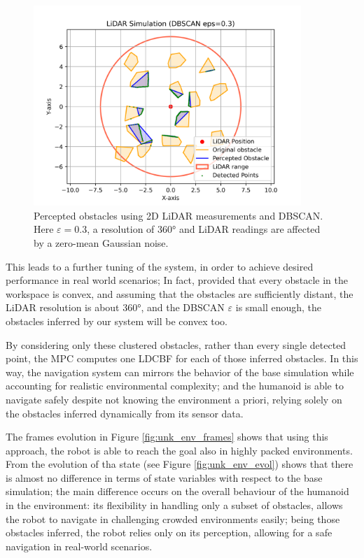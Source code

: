 \begin{figure}[H]
    \centering
    \includegraphics[width=0.9\textwidth]{../figures/Simulations/dbscan/dbscan_and_rangefinder.png}
    \caption{Percepted obstacles using 2D LiDAR measurements and DBSCAN. Here $\varepsilon=0.3$, a resolution of 360° and LiDAR readings are affected by a zero-mean Gaussian noise.}
    \label{fig:dbscan_and_rangefinder}
\end{figure}

This leads to a further tuning of the system, in order to achieve desired performance in real world scenarios; 
In fact, provided that every obstacle in the workspace is convex, and assuming that the obstacles
are sufficiently distant, the LiDAR resolution is about 360°, and the
DBSCAN $\varepsilon$ is small enough, the obstacles inferred by our system will
be convex too.

By considering only these clustered obstacles, rather than every single detected point, the MPC
computes one LDCBF for each of those inferred obstacles. In this way, the navigation system can mirrors
the behavior of the base simulation while accounting for realistic environmental complexity; and the humanoid is
able to navigate safely despite not knowing the environment a priori, relying solely on the obstacles inferred dynamically from its sensor data.

The frames evolution in Figure \ref{fig:unk_env_frames} shows that using this approach, the robot is able to reach
the goal also in highly packed environments. From the evolution of tha state (see
Figure \ref{fig:unk_env_evol}) shows that there is almost no difference
in terms of state variables with respect to the base simulation; the main difference occurs on the overall behaviour
of the humanoid in the environment: its flexibility in handling only a subset of obstacles, allows the robot to
navigate in challenging crowded environments easily; being those obstacles inferred, the robot relies only on its
perception, allowing for a safe navigation in real-world scenarios.

